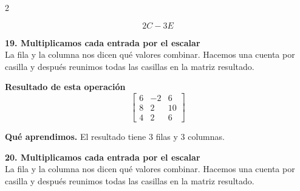 \documentclass[11pt,a4paper,landscape]{article}
\begin{document}
\begin{multicols*}{2}
\begin{minipage}{\linewidth}
\[2C-3E\]
\end{minipage}\par\medskip
\noindent\begin{minipage}{\linewidth}\textbf{19. Multiplicamos cada entrada por el escalar}\\[2pt]La fila y la columna nos dicen qué valores combinar. Hacemos una cuenta por casilla y después reunimos todas las casillas en la matriz resultado.
\par{}\par\smallskip
\par\smallskip \textbf{Resultado de esta operación}\[\begin{bmatrix}6 & -2 & 6\\8 & 2 & 10\\4 & 2 & 6\end{bmatrix}\]
\par\smallskip\textbf{Qué aprendimos.} El resultado tiene 3 filas y 3 columnas.
\end{minipage}\par\medskip
\noindent\begin{minipage}{\linewidth}\textbf{20. Multiplicamos cada entrada por el escalar}\\[2pt]La fila y la columna nos dicen qué valores combinar. Hacemos una cuenta por casilla y después reunimos todas las casillas en la matriz resultado.

\end{minipage}
\end{multicols*}
\end{document}
